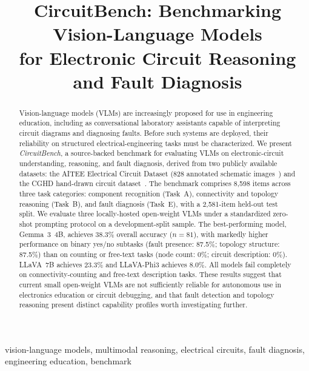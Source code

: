 \documentclass[conference]{IEEEtran}
\begin{document}
\title{CircuitBench: Benchmarking Vision-Language Models\\
for Electronic Circuit Reasoning and Fault Diagnosis}

\author{
}

\maketitle

\begin{abstract}
Vision-language models (VLMs) are increasingly proposed for use in
engineering education, including as conversational laboratory assistants
capable of interpreting circuit diagrams and diagnosing faults.
Before such systems are deployed, their reliability on structured
electrical-engineering tasks must be characterized.
We present \emph{CircuitBench}, a source-backed benchmark for evaluating
VLMs on electronic-circuit understanding, reasoning, and fault diagnosis,
derived from two publicly available datasets: the AITEE Electrical Circuit
Dataset (828 annotated schematic images~\cite{knievel2025aitee_dataset})
and the CGHD hand-drawn circuit dataset~\cite{thoma2025cghd}.
The benchmark comprises 8,598 items across three task categories:
component recognition (Task~A), connectivity and topology reasoning
(Task~B), and fault diagnosis (Task~E), with a 2,581-item held-out
test split.
We evaluate three locally-hosted open-weight VLMs under a standardized
zero-shot prompting protocol on a development-split sample.
The best-performing model, Gemma~3~4B, achieves 38.3\% overall accuracy
($n{=}81$), with markedly higher performance on binary yes/no subtasks
(fault presence: 87.5\%; topology structure: 87.5\%) than on counting or
free-text tasks (node count: 0\%; circuit description: 0\%).
LLaVA~7B achieves 23.3\% and LLaVA-Phi3 achieves 8.0\%.
All models fail completely on connectivity-counting and free-text
description tasks.
These results suggest that current small open-weight VLMs are not
sufficiently reliable for autonomous use in electronics education or
circuit debugging, and that fault detection and topology reasoning
present distinct capability profiles worth investigating further.
\end{abstract}

\begin{IEEEkeywords}
vision-language models, multimodal reasoning, electrical circuits,
fault diagnosis, engineering education, benchmark
\end{IEEEkeywords}
\end{document}
